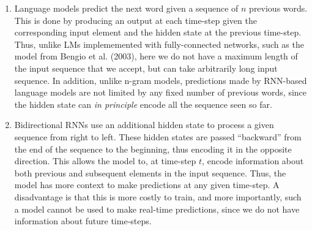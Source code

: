 \documentclass[11pt,a4paper]{article}
\begin{document}
\begin{enumerate}[label=(\alph*)]
          In both cases, the inputs and hidden states are as described in answer
          to question (a) above.
    \item Language models predict the next word given a sequence of $n$ previous
          words.
          This is done by producing an output at each time-step given the
          corresponding input element and the hidden state at the previous
          time-step.
          Thus, unlike LMs implememented with fully-connected networks, such as
          the model from Bengio et al. (2003), here we do not have a maximum
          length of the input sequence that we accept, but can take arbitrarily
          long input sequence.
          In addition, unlike n-gram models, predictions made by RNN-based
          language models are not limited by any fixed number of previous words,
          since the hidden state can \emph{in principle} encode all the sequence
          seen so far.
    \item Bidirectional RNNs use an additional hidden state to process a given
          sequence from right to left.
          These hidden states are passed ``backward'' from the end of the
          sequence to the beginning, thus encoding it in the opposite direction.
          This allows the model to, at time-step $t$, encode information about
          both previous and subsequent elements in the input sequence.
          Thus, the model has more context to make predictions at any given
          time-step.
          A disadvantage is that this is more costly to train, and more
          importantly, such a model cannot be used to make real-time
          predictions, since we do not have information about future time-steps.


\end{enumerate}
\end{document}
